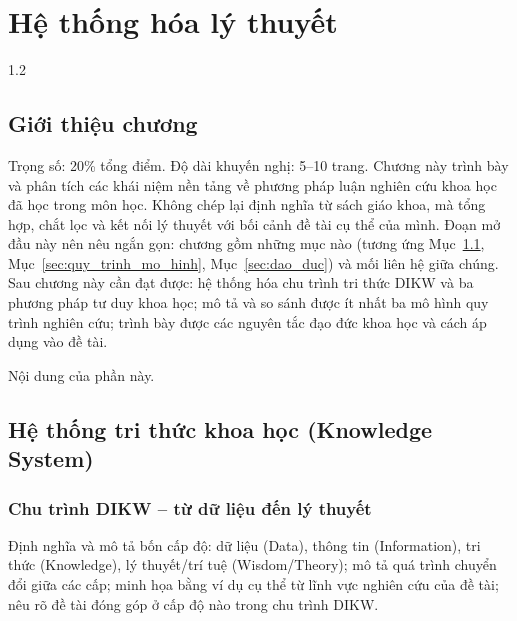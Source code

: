 
\chapter{Hệ thống hóa lý thuyết}
\label{ch:chuong1}

\begin{spacing}{1.2}

\section*{Giới thiệu chương}

\begin{huongdan}
Trọng số: 20\% tổng điểm. Độ dài khuyến nghị: 5--10 trang. Chương này trình bày và phân tích các khái niệm nền tảng về phương pháp luận nghiên cứu khoa học đã học trong môn học. Không chép lại định nghĩa từ sách giáo khoa, mà tổng hợp, chắt lọc và kết nối lý thuyết với bối cảnh đề tài cụ thể của mình. Đoạn mở đầu này nên nêu ngắn gọn: chương gồm những mục nào (tương ứng Mục~\ref{sec:tri_thuc}, Mục~\ref{sec:quy_trinh_mo_hinh}, Mục~\ref{sec:dao_duc}) và mối liên hệ giữa chúng. Sau chương này cần đạt được: hệ thống hóa chu trình tri thức DIKW và ba phương pháp tư duy khoa học; mô tả và so sánh được ít nhất ba mô hình quy trình nghiên cứu; trình bày được các nguyên tắc đạo đức khoa học và cách áp dụng vào đề tài.
\end{huongdan}

Nội dung của phần này.

\section{Hệ thống tri thức khoa học (Knowledge System)}
\label{sec:tri_thuc}

\subsection{Chu trình DIKW -- từ dữ liệu đến lý thuyết}
\label{subsec:dikw}

\begin{huongdan}
Định nghĩa và mô tả bốn cấp độ: dữ liệu (Data), thông tin (Information), tri thức (Knowledge), lý thuyết/trí tuệ (Wisdom/Theory); mô tả quá trình chuyển đổi giữa các cấp; minh họa bằng ví dụ cụ thể từ lĩnh vực nghiên cứu của đề tài; nêu rõ đề tài đóng góp ở cấp độ nào trong chu trình DIKW.
\end{huongdan}


\end{spacing}
